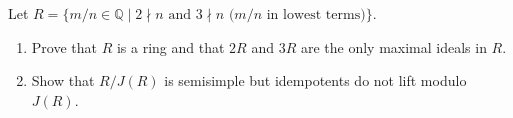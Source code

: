 Let $R = \{m/n \in \mathbb{Q} \mid 2 \nmid n \text{ and } 3 \nmid n \text{ (} m/n \text{ in lowest terms)}\}$.
\begin{enumerate}
\item[(1)] Prove that $R$ is a ring and that $2R$ and $3R$ are the only maximal ideals in $R$.
\item[(2)] Show that $R/J(R)$ is semisimple but idempotents do not lift modulo $J(R)$.
\end{enumerate}
